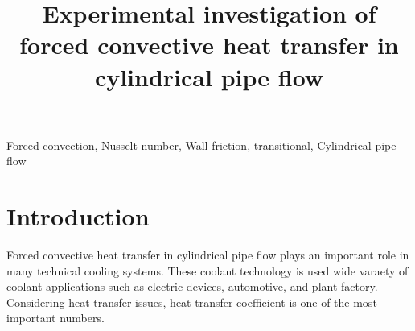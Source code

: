 \documentclass[conference]{IEEEtran}
\begin{document}
\title{Experimental investigation of forced convective heat transfer in cylindrical pipe flow\\
}

\author{
}

\maketitle


\begin{IEEEkeywords}
Forced convection, Nusselt number, Wall friction, transitional, Cylindrical pipe flow
\end{IEEEkeywords}

\section{Introduction}
Forced convective heat transfer in cylindrical pipe flow plays an important role in many technical cooling systems.
These coolant technology is used wide varaety of coolant applications such as electric devices, automotive, and plant factory.
Considering heat transfer issues, heat transfer coefficient is one of the most important numbers.
\end{document}
